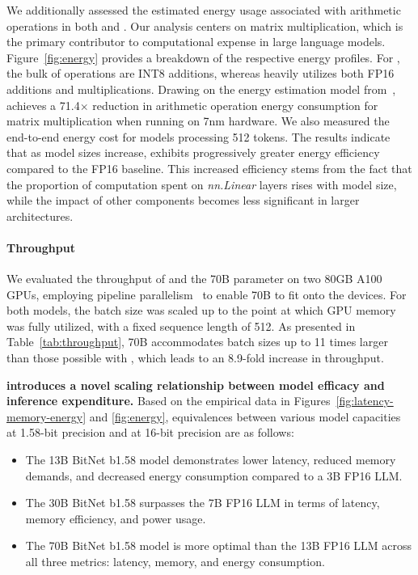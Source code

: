 We additionally assessed the estimated energy usage associated with arithmetic operations in both  and . Our analysis centers on matrix multiplication, which is the primary contributor to computational expense in large language models. Figure~\ref{fig:energy} provides a breakdown of the respective energy profiles. For , the bulk of operations are INT8 additions, whereas  heavily utilizes both FP16 additions and multiplications. Drawing on the energy estimation model from~\cite{energycost, pokebnn},  achieves a 71.4$\times$ reduction in arithmetic operation energy consumption for matrix multiplication when running on 7nm hardware. We also measured the end-to-end energy cost for models processing 512 tokens. The results indicate that as model sizes increase,  exhibits progressively greater energy efficiency compared to the FP16  baseline. This increased efficiency stems from the fact that the proportion of computation spent on \emph{nn.Linear} layers rises with model size, while the impact of other components becomes less significant in larger architectures.

\paragraph{Throughput}

We evaluated the throughput of  and the 70B parameter  on two 80GB A100 GPUs, employing pipeline parallelism~\cite{gpipe} to enable  70B to fit onto the devices. For both models, the batch size was scaled up to the point at which GPU memory was fully utilized, with a fixed sequence length of 512. As presented in Table~\ref{tab:throughput},  70B accommodates batch sizes up to 11 times larger than those possible with , which leads to an 8.9-fold increase in throughput.

\textbf{ introduces a novel scaling relationship between model efficacy and inference expenditure.} Based on the empirical data in Figures~\ref{fig:latency-memory-energy} and \ref{fig:energy}, equivalences between various model capacities at 1.58-bit precision and at 16-bit precision are as follows:

\begin{itemize}
    \item The 13B BitNet b1.58 model demonstrates lower latency, reduced memory demands, and decreased energy consumption compared to a 3B FP16 LLM.
    \item The 30B BitNet b1.58 surpasses the 7B FP16 LLM in terms of latency, memory efficiency, and power usage.
    \item The 70B BitNet b1.58 model is more optimal than the 13B FP16 LLM across all three metrics: latency, memory, and energy consumption.
\end{itemize}

